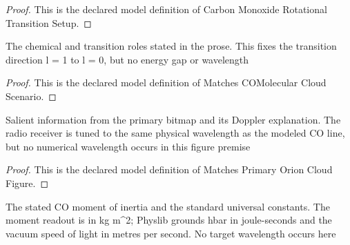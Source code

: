 \begin{proof}
  This is the declared model definition of Carbon Monoxide Rotational Transition Setup.
\end{proof}
\begin{definition}
  \label{def:physics:phyx-mini-0628:phyxminiproblems-problemphyxmini0628-matchescomolecularcloudscenario}
  The chemical and transition roles stated in the prose. This fixes the transition direction l = 1 to l = 0, but no energy gap or wavelength
\end{definition}
\begin{proof}
  This is the declared model definition of Matches COMolecular Cloud Scenario.
\end{proof}
\begin{definition}
  \label{def:physics:phyx-mini-0628:phyxminiproblems-problemphyxmini0628-matchesprimaryorioncloudfigure}
  Salient information from the primary bitmap and its Doppler explanation. The radio receiver is tuned to the same physical wavelength as the modeled CO line, but no numerical wavelength occurs in this figure premise
\end{definition}
\begin{proof}
  This is the declared model definition of Matches Primary Orion Cloud Figure.
\end{proof}
\begin{definition}
  \label{def:physics:phyx-mini-0628:phyxminiproblems-problemphyxmini0628-usesproblemandreferencedata}
  The stated CO moment of inertia and the standard universal constants. The moment readout is in kg m\textasciicircum{}2; Physlib grounds hbar in joule-seconds and the vacuum speed of light in metres per second. No target wavelength occurs here
\end{definition}
